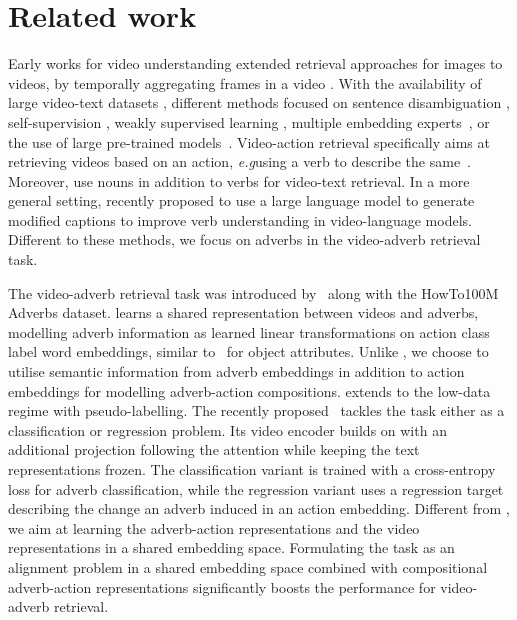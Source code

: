 \documentclass[table]{bmvc2k}
\def\eg{\emph{e.g}\bmvaOneDot}
\begin{document}
\section{Related work}
Early works for video understanding extended retrieval approaches for images to videos, by temporally aggregating frames in a video \cite{dong2018predicting, otani2016learning,torabi2016learning, xu2015jointly}. With the availability of large video-text datasets \cite{anne2017localizing,krishna2017dense,miech2019howto100m,oncescu2021queryd,wang2019vatex, xu2016msr,zhou2018towards,bain2021frozen}, different methods focused on sentence disambiguation \cite{chen2019cross, wray2019fine}, self-supervision \cite{alayrac2020self,rouditchenko2020avlnet,zhu2020actbert}, weakly supervised learning \cite{miech2020end,miech2019howto100m,patrick2020support}, multiple embedding experts~\cite{miech2018learning,liu2019use,gabeur2020multi}, or the use of large pre-trained models~\cite{lei2021less,luo2022clip4clip,wu2022cap4video,park2022exposing}. 
Video-action retrieval specifically aims at retrieving videos based on an action, \eg using a verb to describe the same~\cite{hahn2019action2vec,wray2019learning}.
Moreover, \cite{chen2020fine, wray2019fine, xu2015jointly, zhukov2019cross, ge2022bridging} use nouns in addition to verbs for video-text retrieval. In a more general setting, \cite{momeni2023verbs} recently proposed to use a large language model to generate modified captions to improve verb understanding in video-language models. Different to these methods, we focus on adverbs in the video-adverb retrieval task.

The video-adverb retrieval task was introduced by~\cite{doughty_action_2020} along with the HowTo100M Adverbs dataset. \cite{doughty_action_2020} learns a shared representation between videos and adverbs, modelling adverb information as learned linear transformations on action class label word embeddings, similar to~\cite{nagarajan2018attributes} for object attributes. Unlike \cite{doughty_action_2020}, we choose to utilise semantic information from adverb embeddings in addition to action embeddings for modelling adverb-action compositions. 
\cite{doughty_how_2022} extends \cite{doughty_action_2020} to the low-data regime with pseudo-labelling. 
The recently proposed~\cite{moltisanti2023learning} tackles the task either as a classification or regression problem. Its video encoder builds on \cite{doughty_action_2020} with an additional projection following the attention while keeping the text representations frozen. The classification variant is trained with a cross-entropy loss for adverb classification, while the regression variant uses a regression target describing the change an adverb induced in an action embedding. 
Different from \cite{moltisanti2023learning}, we aim at learning the adverb-action representations and the video representations in a shared embedding space. Formulating the task as an alignment problem in a shared embedding space combined with compositional adverb-action representations significantly boosts the performance for video-adverb retrieval. 
\end{document}
